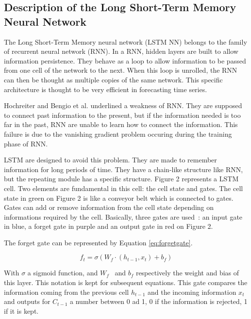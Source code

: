 \subsection{Description of the Long Short-Term Memory Neural Network}

The Long Short-Term Memory neural network (LSTM NN) belongs to the family of recurrent neural network (RNN). 
In a RNN, hidden layers are built to allow information persistence. They behave as a loop to allow information 
to be passed from one cell of the network to the next. When this loop is unrolled, the RNN can then be thought 
as multiple copies of the same network. This specific architecture is thought to be very efficient in 
forecasting time series. 

Hochreiter \cite{hochreiter1991untersuchungen} and Bengio et al. \cite{bengio1994learning} underlined a weakness of RNN. 
They are supposed to connect past information to the present, but if the information needed is too far in the past, 
RNN are unable to learn how to connect the information. This failure is due to the vanishing gradient problem 
occuring during the training phase of RNN. 

LSTM are designed to avoid this problem. They are made to remember information for long periods of time. 
They have a chain-like structure like RNN, but the repeating module has a specific structure. 
Figure 2 represents a LSTM cell. Two elements are fundamental in this cell: the cell state and gates. 
The cell state in green on Figure 2 is like a conveyor belt which is connected to gates. 
Gates can add or remove information from the cell state depending on informations required by the cell. 
Basically, three gates are used : an input gate in blue, a forget gate in purple and an output gate in red 
on Figure 2. 


The forget gate can be represented by Equation \ref{eq:forgetgate}. 



\begin{equation}\label{eq:forgetgate}
 f_{t} = \sigma  \left( W_f \cdot  \left( h_{t-1}, x_t \right) + b_f \right)
\end{equation}

\vspace{\baselineskip}

With  \(  \sigma  \)  a sigmoid function, and  \( W_{f} \) \  and  \( b_{f} \)  respectively the 
weight and bias of this layer. This notation is kept for subsequent equations. This gate compares 
the information coming from the previous cell  \( h_{t-1} \) and the incoming information  \( x_{t} \)  
and outputs for  \( C_{t-1}  \) a number between 0 ad 1, 0 if the information is rejected, 1 if it is kept.

